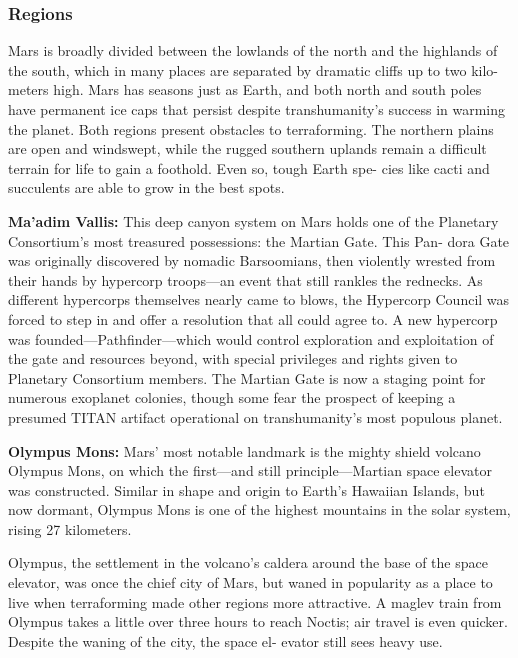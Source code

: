 \subsubsection{Regions}

Mars is broadly divided between the lowlands of the 
north and the highlands of the south, which in many 
places are separated by dramatic cliffs up to two kilo-
meters high. Mars has seasons just as Earth, and both 
north and south poles have permanent ice caps that 
persist despite transhumanity's success in warming the 
planet. Both regions present obstacles to terraforming. 
The northern plains are open and windswept, while 
the rugged southern uplands remain a difficult terrain 
for life to gain a foothold. Even so, tough Earth spe-
cies like cacti and succulents are able to grow in the 
best spots.

\textbf{Ma'adim Vallis:} This deep canyon system on 
Mars holds one of the Planetary Consortium's most 
treasured possessions: the Martian Gate. This Pan-
dora Gate was originally discovered by nomadic 
Barsoomians, then violently wrested from their hands 
by hypercorp troops—an event that still rankles the 
rednecks. As different hypercorps themselves nearly 
came to blows, the Hypercorp Council was forced to 
step in and offer a resolution that all could agree to. 
A new hypercorp was founded—Pathfinder—which 
would control exploration and exploitation of the 
gate and resources beyond, with special privileges and 
rights given to Planetary Consortium members. The 
Martian Gate is now a staging point for numerous 
exoplanet colonies, though some fear the prospect of 
keeping a presumed TITAN artifact operational on 
transhumanity's most populous planet.

\textbf{Olympus Mons:} Mars' most notable landmark is 
the mighty shield volcano Olympus Mons, on which 
the first—and still principle—Martian space elevator 
was constructed. Similar in shape and origin to Earth's 
Hawaiian Islands, but now dormant, Olympus Mons 
is one of the highest mountains in the solar system, 
rising 27 kilometers.

Olympus, the settlement in the volcano's caldera 
around the base of the space elevator, was once the 
chief city of Mars, but waned in popularity as a place 
to live when terraforming made other regions more 
attractive. A maglev train from Olympus takes a little 
over three hours to reach Noctis; air travel is even 
quicker. Despite the waning of the city, the space el-
evator still sees heavy use.

